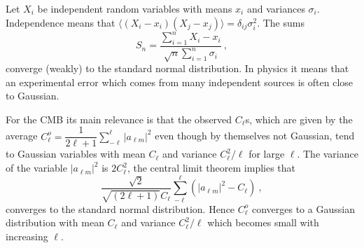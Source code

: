 \documentclass[12pt,a4paper]{article}
\begin{document}
Let $X_i$ be independent random variables with means $x_i$ and variances $\sigma_i$. Independence means that $\langle (X_i -x_i)(X_j -x_j) \rangle = \delta_{ij} \sigma_i^2$. The sums
\begin{equation}
S_n = \dfrac{\sum\limits_{i=1}^n X_i -x_i}{\sqrt{n} \sum\limits_{i=1}^n \sigma_i} ~,
\end{equation}
converge (weakly) to the standard normal distribution. In physics it means that an experimental error which comes from many independent sources is often close to Gaussian.

For the CMB its main relevance is that the observed $C_{\ell}$s, which are given by the average $C^o_\ell = \dfrac{1}{2\ell+1} \sum\limits_{-\ell}^{\ell} |a_{\ell m} |^2$ even though by themselves not Gaussian, tend to Gaussian variables with mean $C_{\ell}$ and variance $C_{\ell}^2/\ell$ for large $\ell$. The variance of the variable $|a_{\ell m}|^2$ is $2C_{\ell}^2$,  the central limit theorem implies that
\begin{equation}
\dfrac{\sqrt{2}}{\sqrt{(2\ell+1)} C_\ell} \sum_{-\ell}^\ell (|a_{\ell m}|^2 - C_\ell) ~,
\end{equation}
converges to the standard normal distribution. Hence $C_{\ell}^o$ converges to a Gaussian distribution with mean $C_{\ell}$ and variance $C_{\ell}^2/\ell$ which becomes small with increasing $\ell$.
\end{document}
